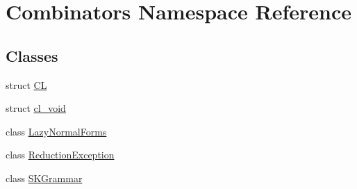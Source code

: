 \hypertarget{namespace_combinators}{}\section{Combinators Namespace Reference}
\label{namespace_combinators}
\subsection*{Classes}
\begin{DoxyCompactItemize}
\item 
struct \hyperlink{struct_combinators_1_1_c_l}{CL}
\item 
struct \hyperlink{struct_combinators_1_1cl__void}{cl\+\_\+void}
\item 
class \hyperlink{class_combinators_1_1_lazy_normal_forms}{Lazy\+Normal\+Forms}
\item 
class \hyperlink{class_combinators_1_1_reduction_exception}{Reduction\+Exception}
\item 
class \hyperlink{class_combinators_1_1_s_k_grammar}{S\+K\+Grammar}
\end{DoxyCompactItemize}
